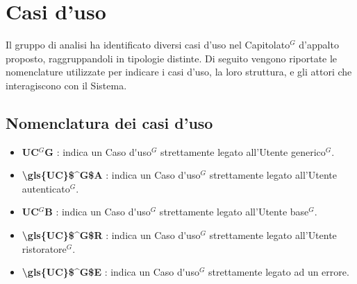 \section{Casi d'uso}

Il gruppo di analisi ha identificato diversi casi d'uso nel \gls{Capitolato}$^G$ d'appalto proposto, raggruppandoli in tipologie distinte. 
Di seguito vengono riportate le nomenclature utilizzate per indicare i casi d'uso, la loro struttura, e gli attori che interagiscono con il Sistema.

\subsection{Nomenclatura dei casi d'uso}
\begin{itemize}
	\item \textbf{\gls{UC}$^G$G} : indica un \gls{Caso d'uso}$^G$ strettamente legato all'\gls{Utente generico}$^G$.
	\item \textbf{\gls{\gls{UC}$^G$A}} : indica un \gls{Caso d'uso}$^G$ strettamente legato all'\gls{Utente autenticato}$^G$.
	\item \textbf{\gls{UC}$^G$B} : indica un \gls{Caso d'uso}$^G$ strettamente legato all'\gls{Utente base}$^G$.
	\item \textbf{\gls{\gls{UC}$^G$R}} : indica un \gls{Caso d'uso}$^G$ strettamente legato all'\gls{Utente ristoratore}$^G$.
	\item \textbf{\gls{\gls{UC}$^G$E}} : indica un \gls{Caso d'uso}$^G$ strettamente legato ad un errore.
\end{itemize}
